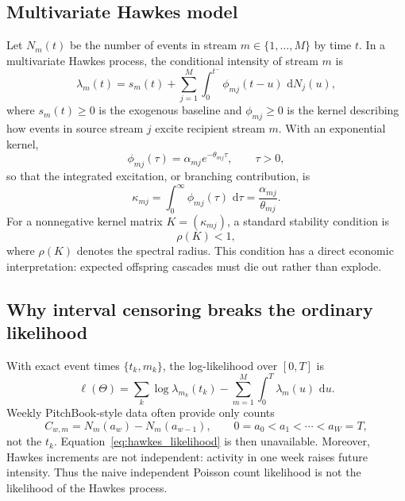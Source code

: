 \documentclass[11pt]{article}
\theoremstyle{plain}
\theoremstyle{definition}
\theoremstyle{remark}
\newcommand{\dd}{\,\mathrm{d}}
\begin{document}
\subsection{Multivariate Hawkes model}
Let $N_m(t)$ be the number of events in stream $m\in\{1,\ldots,M\}$ by time $t$. In a multivariate Hawkes process, the conditional intensity of stream $m$ is
\begin{equation}
\lambda_m(t)
= s_m(t) + \sum_{j=1}^{M}\int_0^{t^-} \phi_{mj}(t-u)\,\dd N_j(u),
\label{eq:hawkes}
\end{equation}
where $s_m(t)\ge0$ is the exogenous baseline and $\phi_{mj}\ge0$ is the kernel describing how events in source stream $j$ excite recipient stream $m$. With an exponential kernel,
\begin{equation}
\phi_{mj}(\tau)=\alpha_{mj}e^{-\theta_{mj}\tau},\qquad \tau>0,
\end{equation}
so that the integrated excitation, or branching contribution, is
\begin{equation}
\kappa_{mj}=\int_0^\infty \phi_{mj}(\tau)\,\dd\tau=\frac{\alpha_{mj}}{\theta_{mj}}.
\end{equation}
For a nonnegative kernel matrix $K=(\kappa_{mj})$, a standard stability condition is
\begin{equation}
\rho(K)<1,
\label{eq:spectral_stability}
\end{equation}
where $\rho(K)$ denotes the spectral radius. This condition has a direct economic interpretation: expected offspring cascades must die out rather than explode.

\subsection{Why interval censoring breaks the ordinary likelihood}
With exact event times $\{t_k,m_k\}$, the log-likelihood over $[0,T]$ is
\begin{equation}
\ell(\Theta)=\sum_{k}\log \lambda_{m_k}(t_k)-\sum_{m=1}^{M}\int_0^T\lambda_m(u)\,\dd u.
\label{eq:hawkes_likelihood}
\end{equation}
Weekly PitchBook-style data often provide only counts
\begin{equation}
C_{w,m}=N_m(a_w)-N_m(a_{w-1}),\qquad 0=a_0<a_1<\cdots<a_W=T,
\end{equation}
not the $t_k$. Equation~\eqref{eq:hawkes_likelihood} is then unavailable. Moreover, Hawkes increments are not independent: activity in one week raises future intensity. Thus the naive independent Poisson count likelihood is not the likelihood of the Hawkes process.
\end{document}
